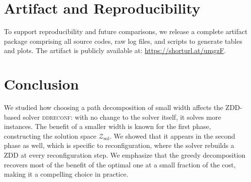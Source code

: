 \documentclass[conference]{IEEEtran}
\newcommand{\zsol}{\mathcal{Z}_{\mathrm{sol}}}
\newcommand{\ISR}{\textsc{ISR}\xspace}
\begin{document}
\section{Artifact and Reproducibility}
\label{sec:artifact}

To support reproducibility and future comparisons, we release a complete artifact package comprising all source codes, raw log files, and scripts to generate tables and plots. The artifact is publicly available at: \url{https://shorturl.at/umgzF}.



\section{Conclusion}
\label{sec:conclusion}

We studied how choosing a path decomposition of small width affects the ZDD-based solver \textsc{ddreconf}: with no change to the solver itself, it solves more instances. 
The benefit of a smaller width is known for the first phase, constructing the solution space $\zsol$. 
We showed that it appears in the second phase as well, which is specific to reconfiguration, where the solver rebuilds a ZDD at every reconfiguration step. 
We emphasize that the greedy decomposition recovers most of the benefit of the optimal one at a small fraction of the cost, making it a compelling choice in practice. 

\end{document}
